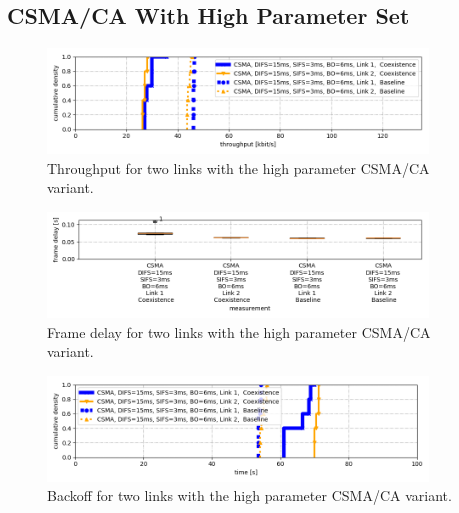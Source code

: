 \clearpage

\subsection{CSMA/CA With High Parameter Set}

\begin{figure}[tb]
	\label{fig:results-csma-high-dbl-throughput}
	\begin{center}
		\includegraphics[width=0.9\textwidth]{pictures/results/same_combinations/csma_high_params/throughput_cdf}
	\end{center}
	\caption{Throughput for two links with the high parameter CSMA/CA variant.}
\end{figure}

\begin{figure}[tb]
	\label{fig:results-csma-high-dbl-frame-delay}
	\begin{center}
		\includegraphics[width=0.9\textwidth]{pictures/results/same_combinations/csma_high_params/frame_delay_boxplot}
	\end{center}
	\caption{Frame delay for two links with the high parameter CSMA/CA variant.}
\end{figure}

\begin{figure}[tb]
	\label{fig:results-csma-high-dbl-backoff}
	\begin{center}
		\includegraphics[width=0.9\textwidth]{pictures/results/same_combinations/csma_high_params/backoff_(joint)_sum_cdf}
	\end{center}
	\caption{Backoff for two links with the high parameter CSMA/CA variant.}
\end{figure}

